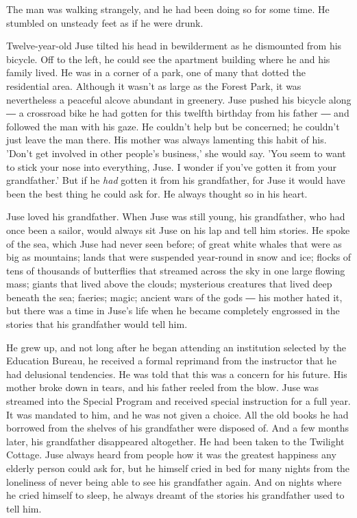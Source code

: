 \mybreak

The man was walking strangely, and he had been doing so for some time.
He stumbled on unsteady feet as if he were drunk.

Twelve-year-old Juse tilted his head in bewilderment as he dismounted
from his bicycle. Off to the left, he could see the apartment building
where he and his family lived. He was in a corner of a park, one of many
that dotted the residential area. Although it wasn't as large as the
Forest Park, it was nevertheless a peaceful alcove abundant in greenery.
Juse pushed his bicycle along ― a crossroad bike he had gotten for this
twelfth birthday from his father ― and followed the man with his gaze.
He couldn't help but be concerned; he couldn't just leave the man there.
His mother was always lamenting this habit of his. 'Don't get involved
in other people's business,' she would say. 'You seem to want to stick
your nose into everything, Juse. I wonder if you've gotten it from your
grandfather.' But if he \emph{had} gotten it from his grandfather, for Juse it
would have been the best thing he could ask for. He always thought so in
his heart.

Juse loved his grandfather. When Juse was still young, his grandfather,
who had once been a sailor, would always sit Juse on his lap and tell
him stories. He spoke of the sea, which Juse had never seen before; of
great white whales that were as big as mountains; lands that were
suspended year-round in snow and ice; flocks of tens of thousands of
butterflies that streamed across the sky in one large flowing mass;
giants that lived above the clouds; mysterious creatures that lived deep
beneath the sea; faeries; magic; ancient wars of the gods ― his mother
hated it, but there was a time in Juse's life when he became completely
engrossed in the stories that his grandfather would tell him.

He grew up, and not long after he began attending an institution
selected by the Education Bureau, he received a formal reprimand from
the instructor that he had delusional tendencies. He was told that this
was a concern for his future. His mother broke down in tears, and his
father reeled from the blow. Juse was streamed into the Special Program
and received special instruction for a full year. It was mandated to
him, and he was not given a choice. All the old books he had borrowed
from the shelves of his grandfather were disposed of. And a few months
later, his grandfather disappeared altogether. He had been taken to the
Twilight Cottage. Juse always heard from people how it was the greatest
happiness any elderly person could ask for, but he himself cried in bed
for many nights from the loneliness of never being able to see his
grandfather again. And on nights where he cried himself to sleep, he
always dreamt of the stories his grandfather used to tell him.

